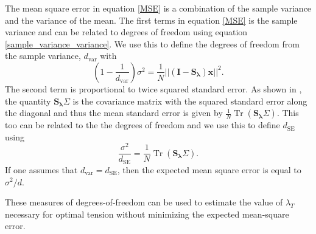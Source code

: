 \documentclass[10pt,journal]{IEEEtran}
\DeclareMathOperator{\Tr}{Tr}
\begin{document}
The mean square error in equation \ref{MSE} is a combination of the sample variance and the variance of the mean. The first terms in equation \ref{MSE} is the sample variance and can be related to degrees of freedom using equation \ref{sample_variance_variance}. We use this to define the degrees of freedom from the sample variance, $d_{\textrm{var}}$ with
\begin{equation}
\label{dof_var}
    \left(1-\frac{1}{d_{\textrm{var}}} \right)\sigma^2 = \frac{1}{N} || \left( \mathbf{I} - \mathbf{S_\lambda} \right) \mathbf{x} ||^2.
\end{equation}
The second term is proportional to twice squared standard error. As shown in \cite{teanby2007-mg}, the quantity $\mathbf{S_\lambda} \Sigma$ is the covariance matrix with the squared standard error along the diagonal and thus the mean standard error is given by $\frac{1}{N} \Tr \left( \mathbf{S_\lambda} \Sigma \right)$. This too can be related to the the degrees of freedom and we use this to define $d_{\textrm{SE}}$ using
\begin{equation}
\label{dof_se}
    \frac{\sigma^2}{d_{\textrm{SE}}} = \frac{1}{N} \Tr \left( \mathbf{S_\lambda} \Sigma \right).
\end{equation}
If one assumes that $d_{\textrm{var}} = d_{\textrm{SE}}$, then the expected mean square error is equal to $\sigma^2/d$.

These measures of degrees-of-freedom can be used to estimate the value of $\lambda_T$ necessary for optimal tension without minimizing the expected mean-square error. 

\end{document}
